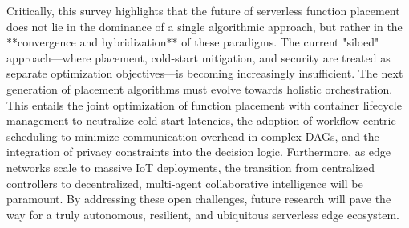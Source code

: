 \documentclass[lettersize,journal]{IEEEtran}
\begin{document}
Critically, this survey highlights that the future of serverless function placement does not lie in the dominance of a single algorithmic approach, but rather in the **convergence and hybridization** of these paradigms. The current "siloed" approach—where placement, cold-start mitigation, and security are treated as separate optimization objectives—is becoming increasingly insufficient. The next generation of placement algorithms must evolve towards holistic orchestration. This entails the joint optimization of function placement with container lifecycle management to neutralize cold start latencies, the adoption of workflow-centric scheduling to minimize communication overhead in complex DAGs, and the integration of privacy constraints into the decision logic. Furthermore, as edge networks scale to massive IoT deployments, the transition from centralized controllers to decentralized, multi-agent collaborative intelligence will be paramount. By addressing these open challenges, future research will pave the way for a truly autonomous, resilient, and ubiquitous serverless edge ecosystem.
\end{document}
